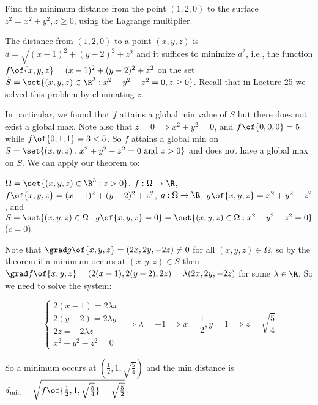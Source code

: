 \begin{example}
    Find the minimum distance from the point $(1,2,0)$ to the surface $z^2 = x^2 + y^2, z \geq 0$, using the Lagrange multiplier.

    The distance from $(1,2,0)$ to a point $(x,y,z)$ is $d = \sqrt{(x-1)^2 + (y-2)^2 + z^2}$ and it suffices to minimize $d^2$, i.e., the function $f\of{x,y,z} = (x-1)^2 + (y-2)^2 + z^2$ on the set $\tilde{S} = \set{(x,y,z) \in \R^3: x^2 + y^2 - z^2 = 0, z \geq 0}$. Recall that in Lecture 25 we solved this problem by eliminating $z$.
    
    In particular, we found that $f$ attains a global min value of $\tilde{S}$ but there does not exist a global max. Note also that $z = 0 \implies x^2 + y^2 = 0$, and $f\of{0,0,0} = 5$ while $f\of{0,1,1} = 3 < 5$. So $f$ attains a global min on $S = \set{(x,y,z): x^2 + y^2 - z^2 = 0 \text{ and } z > 0}$ and does not have a global max on $S$. We can apply our theorem to:

    $\Omega = \set{(x,y,z) \in \R^3: z > 0}$. $f: \Omega \to \R$, $f\of{x,y,z} = (x-1)^2 + (y-2)^2 + z^2$, $g: \Omega \to \R$, $g\of{x,y,z} = x^2 + y^2 - z^2$, and $S = \set{(x,y,z) \in \Omega: g\of{x,y,z} = 0} = \set{(x,y,z) \in \Omega: x^2 + y^2 - z^2 = 0}$ ($c = 0$).

    Note that $\grad g\of{x,y,z} = (2x, 2y, -2z) \neq 0$ for all $(x,y,z) \in \Omega$, so by the theorem if a minimum occurs at $(x,y,z) \in S$ then $\grad f\of{x,y,z} = (2(x-1),2(y-2),2z) = \lambda (2x, 2y, -2z)$ for some $\lambda \in \R$. So we need to solve the system:

    \[\left\{ \begin{matrix}
        2(x-1) = 2\lambda x \\
        2(y-2) = 2\lambda y \\
        2z = -2\lambda z \\
        x^2 + y^2 -z^2 = 0
    \end{matrix} \right. \implies \lambda = -1 \implies x = \frac{1}{2}, y = 1 \implies z = \sqrt{\frac{5}{4}}\]

    So a minimum occurs at $\left(\frac{1}{2}, 1, \sqrt{\frac{5}{4}}\right)$ and the min distance is $d_\text{min} = \sqrt{f\of{\frac{1}{2}, 1, \sqrt{\frac{5}{4}}} = \sqrt{\frac{5}{2}}}$.
\end{example}

